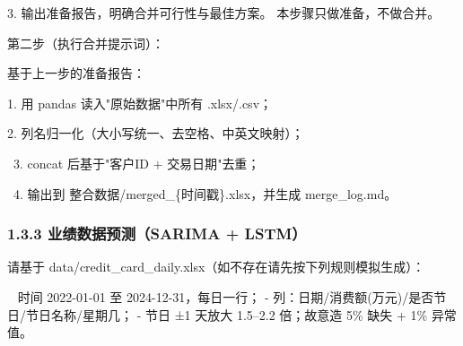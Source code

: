 \documentclass[
  american,
  chinese,
]{ctexart}
\begin{document}
\foreignlanguage{american}{3. }{输出准备报告，明确合并可行性与最佳方案。}{ }{本步骤只做准备，不做合并。}{ }\foreignlanguage{american}{}

{第二步（执行合并提示词）：}\foreignlanguage{american}{}

{基于上一步的准备报告：}{ \foreignlanguage{american}{}}

\foreignlanguage{american}{1{. {用}
pandas {{读入}"{原始数据}"{中所有}}
.xlsx/.csv{；}}
}

\foreignlanguage{american}{2. }{\foreignlanguage{american}{列名归一化（大小写统一、去空格、中英文映射}}{\foreignlanguage{american}{）；}}\foreignlanguage{american}{}

\foreignlanguage{american}{{~}3. {concat} }{\foreignlanguage{american}{后基于}\foreignlanguage{american}{"}\foreignlanguage{american}{客户}\foreignlanguage{american}{ID}}\foreignlanguage{american}{ + }{\foreignlanguage{american}{交易日期}\foreignlanguage{american}{"}{\foreignlanguage{american}{去重}}}{\foreignlanguage{american}{；}}\foreignlanguage{american}{}

\foreignlanguage{american}{{~}4. }{\foreignlanguage{american}{输出到}}\foreignlanguage{american}{ }{\foreignlanguage{american}{整合数据}}\foreignlanguage{american}{/merged\_\{}{\foreignlanguage{american}{时间戳}}\foreignlanguage{american}{\}.{xlsx{，并生成}}
merge\_log.md}\foreignlanguage{american}{。}\foreignlanguage{american}{ }

\subsubsection{\texorpdfstring{\foreignlanguage{american}{1.3.3 }{业绩数据预测（}\foreignlanguage{american}{SARIMA + LSTM}{）}\foreignlanguage{american}{}}{1.3.3 业绩数据预测（SARIMA + LSTM）}}\label{ux4e1aux7ee9ux6570ux636eux9884ux6d4bsarima-lstm}

{\foreignlanguage{american}{请基于}}\foreignlanguage{american}{ data/{credit\_card\_daily.xlsx{（如不存在请先按下列规则模拟生成}}}\foreignlanguage{american}{）：}\foreignlanguage{american}{}

\foreignlanguage{american}{{~ }}{时间}\foreignlanguage{american}{ 2022-01-01 }{至}\foreignlanguage{american}{ 2024-12-31}{，每日一行；}\foreignlanguage{american}{ - }{列：日期}\foreignlanguage{american}{/}{消费额}\foreignlanguage{american}{(}{万元}\foreignlanguage{american}{)/}{是否节日}\foreignlanguage{american}{/}{节日名称}\foreignlanguage{american}{/}{星期几；}\foreignlanguage{american}{ - }{节日}\foreignlanguage{american}{ ±1 }{天放大}\foreignlanguage{american}{
1.5--2.2 }{{倍}}{；故意造}\foreignlanguage{american}{ 5\% }{缺失}\foreignlanguage{american}{ + 1\% }{异常值。}\foreignlanguage{american}{{~ }}
\end{document}

